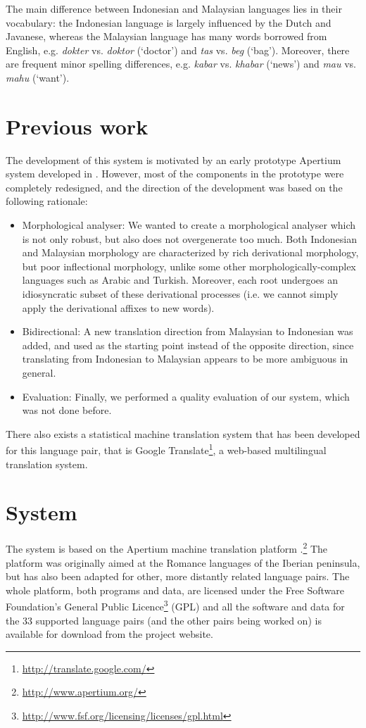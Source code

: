 \documentclass[10pt,a5paper,twoside]{article}
\begin{document}
The main difference between Indonesian and Malaysian languages lies in their vocabulary: the Indonesian language is largely influenced by the Dutch and Javanese, whereas the Malaysian language has many words borrowed from English, e.g. \emph{dokter} vs. \emph{doktor} (`doctor') and \emph{tas} vs. \emph{beg} (`bag'). Moreover, there are frequent minor spelling differences, e.g. \emph{kabar} vs. \emph{khabar} (`news') and \emph{mau} vs. \emph{mahu} (`want').

\section{Previous work}
\label{sec:prev}
The development of this system is motivated by an early prototype Apertium system developed in \citep{larasati2010study}. However, most of the components in the prototype were completely redesigned, and the direction of the development was based on the following rationale:
\begin{itemize}
\item{Morphological analyser: We wanted to create a morphological analyser which is not only robust, but also does not overgenerate too much. Both Indonesian and Malaysian morphology are characterized by rich derivational morphology, but poor inflectional morphology, unlike some other morphologically-complex languages such as Arabic and Turkish. Moreover, each root undergoes an idiosyncratic subset of these derivational processes (i.e. we cannot simply apply the derivational affixes to new words).}
\item{Bidirectional: A new translation direction from Malaysian to Indonesian was added, and used as the starting point instead of the opposite direction, since translating from Indonesian to Malaysian appears to be more ambiguous in general.}
\item{Evaluation: Finally, we performed a quality evaluation of our system, which was not done before.}
\end{itemize}
There also exists a statistical machine translation system that has been developed for this language pair, that is Google Translate\footnote{\url{http://translate.google.com/}}, a web-based multilingual translation system.

\section{System}
\label{sec:sys}
The system is based on the Apertium machine translation platform \citep{apertium/2011}.\footnote{\url{http://www.apertium.org/}} The platform was originally aimed at the Romance languages of the Iberian peninsula, but has also been adapted for other, more distantly related language pairs. The whole platform, both programs and data, are licensed under the Free Software Foundation's General Public Licence\footnote{\url{http://www.fsf.org/licensing/licenses/gpl.html}} (GPL) and all the software and data for the 33 supported language pairs (and the other pairs being worked on) is available for download from the project website.
\end{document}

